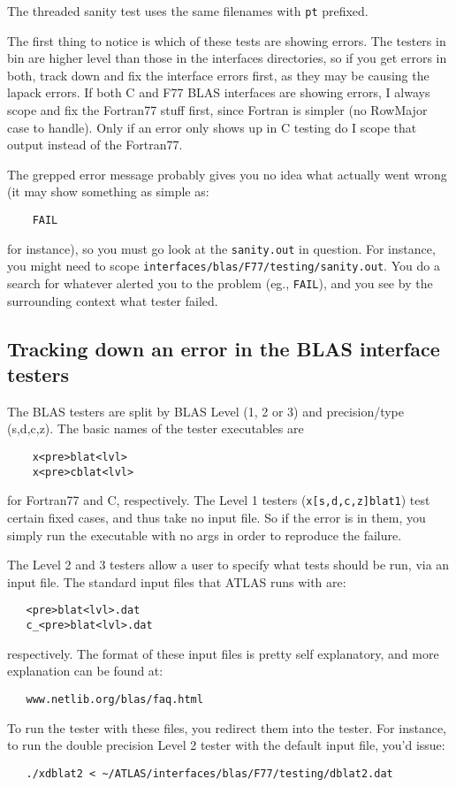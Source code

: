 \documentclass[11pt]{article}
\begin{document}
The threaded sanity test uses the same filenames with {\tt pt} prefixed.

The first thing to notice is which of these tests are showing errors.
The testers in bin are higher level than those in the interfaces directories,
so if you get errors in both, track down and fix the interface errors first,
as they may be causing the lapack errors.  If both C and F77 BLAS interfaces
are showing errors, I always scope and fix the Fortran77 stuff first, since
Fortran is simpler (no RowMajor case to handle).  Only if an error only
shows up in C testing do I scope that output instead of the Fortran77.

The grepped error message probably gives you no idea what actually went wrong
(it may show something as simple as:
\begin{verbatim}
    FAIL
\end{verbatim}
for instance), so you must go look at the {\tt sanity.out} in question.
For instance, you might need to scope
{\tt interfaces/blas/F77/testing/sanity.out}.  You do a search for
whatever alerted you to the problem (eg., {\tt FAIL}), and you see by the
surrounding context what tester failed.

\subsection{Tracking down an error in the BLAS interface testers}
The BLAS testers are split by BLAS Level (1, 2 or 3) and precision/type
(s,d,c,z).  The basic names of the tester executables are 
\begin{verbatim}
    x<pre>blat<lvl>
    x<pre>cblat<lvl>
\end{verbatim}
for Fortran77 and C, respectively.  The Level 1 testers 
({\tt x[s,d,c,z]blat1}) test certain fixed cases, and thus take no input file.
So if the error is in them, you simply run the executable with no args in
order to reproduce the failure.

The Level 2 and 3 testers allow a user to specify what tests should be run,
via an input file.  The standard input files that ATLAS runs with are:
\begin{verbatim}
   <pre>blat<lvl>.dat
   c_<pre>blat<lvl>.dat
\end{verbatim}
respectively.  The format of these input files is pretty self explanatory,
and more explanation can be found at:
\begin{verbatim}
   www.netlib.org/blas/faq.html
\end{verbatim}
To run the tester with these files, you redirect them into the tester.  For
instance, to run the double precision Level 2 tester with the default input
file, you'd issue:
\begin{verbatim}
   ./xdblat2 < ~/ATLAS/interfaces/blas/F77/testing/dblat2.dat
\end{verbatim}
\end{document}
